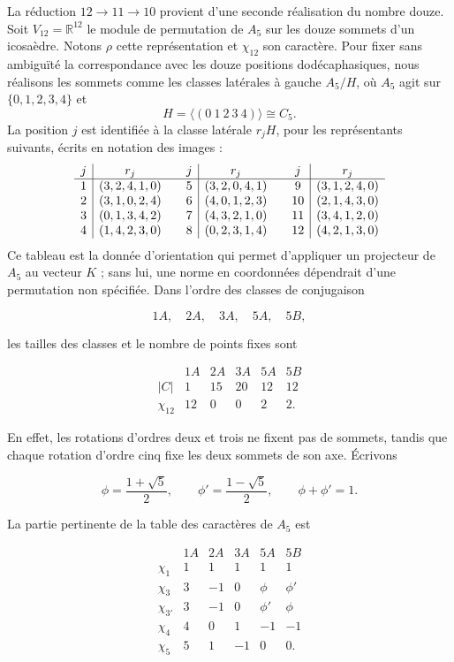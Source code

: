 La réduction \(12\to11\to10\) provient d'une seconde réalisation du nombre
douze. Soit \(V_{12}=\mathbb R^{12}\) le module de permutation de \(A_5\) sur
les douze sommets d'un icosaèdre. Notons \(\rho\) cette représentation
et \(\chi_{12}\) son caractère. Pour fixer sans ambiguïté la correspondance
avec les douze positions dodécaphasiques, nous réalisons les sommets comme les classes latérales
à gauche \(A_5/H\), où \(A_5\) agit sur \(\{0,1,2,3,4\}\) et
\[
 H=\langle(0\ 1\ 2\ 3\ 4)\rangle\cong C_5.
\]
La position \(j\) est identifiée à la classe latérale \(r_jH\), pour les
représentants suivants, écrits en notation des images :
\[
\begin{array}{c|c@{\qquad}c|c@{\qquad}c|c}
j&r_j&j&r_j&j&r_j\\ \hline
1&(3,2,4,1,0)&5&(3,2,0,4,1)&9&(3,1,2,4,0)\\
2&(3,1,0,2,4)&6&(4,0,1,2,3)&10&(2,1,4,3,0)\\
3&(0,1,3,4,2)&7&(4,3,2,1,0)&11&(3,4,1,2,0)\\
4&(1,4,2,3,0)&8&(0,2,3,1,4)&12&(4,2,1,3,0)
\end{array}
\]
Ce tableau est la donnée d'orientation qui permet d'appliquer un projecteur de
\(A_5\) au vecteur \(K\) ; sans lui, une norme en coordonnées dépendrait d'une
permutation non spécifiée. Dans l'ordre des classes de conjugaison

\[
1A,\quad2A,\quad3A,\quad5A,\quad5B,
\]

les tailles des classes et le nombre de points fixes sont

\[
\begin{array}{c|rrrrr}
 &1A&2A&3A&5A&5B\\ \hline
|C|&1&15&20&12&12\\
\chi_{12}&12&0&0&2&2.
\end{array}
\]

En effet, les rotations d'ordres deux et trois ne fixent pas de sommets, tandis
que chaque rotation d'ordre cinq fixe les deux sommets de son axe. Écrivons

\[
\phi=\frac{1+\sqrt5}{2},
\qquad
\phi'=\frac{1-\sqrt5}{2},
\qquad
\phi+\phi'=1.
\]

La partie pertinente de la table des caractères de \(A_5\) est

\[
\begin{array}{c|rrrrr}
 &1A&2A&3A&5A&5B\\ \hline
\chi_1&1&1&1&1&1\\
\chi_3&3&-1&0&\phi&\phi'\\
\chi_{3'}&3&-1&0&\phi'&\phi\\
\chi_4&4&0&1&-1&-1\\
\chi_5&5&1&-1&0&0.
\end{array}
\]


